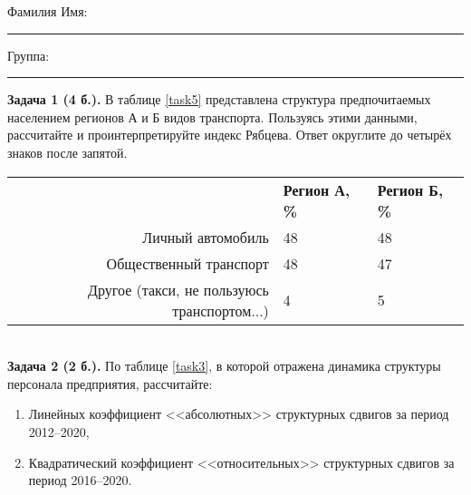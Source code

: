 \documentclass{article}
\begin{document}
\mbox{}

\vspace{-36pt}

\begin{center}
	\begin{tcolorbox}[colback=white, boxrule=0.20ex, sharp corners = all, height=25pt, colframe=black, valign=top]
		\begin{center}
			Фамилия Имя:\hspace{1.5pt}\rule{190pt}{0pt}\hspace{50pt}Группа:\hspace{1.5pt}\rule{60pt}{0pt}
		\end{center}
	\end{tcolorbox}
\end{center}
\vspace{3pt}

\textbf{Задача 1 (4 б.).} В таблице \ref{task5} представлена структура предпочитаемых населением регионов А и Б видов транспорта. Пользуясь этими данными, рассчитайте и проинтерпретируйте индекс Рябцева. Ответ округлите до четырёх знаков после запятой.\\

\begin{minipage}{\textwidth}
\centering
\begin{tabularx}{0.7\textwidth}{rYY}
\toprule
 & \textbf{Регион А, \%} & \textbf{Регион Б, \%} \\
\cmidrule(lr){2-2}\cmidrule(lr){3-3}
Личный автомобиль & 48 & 48 \\

Общественный транспорт & 48 & 47 \\

Другое (такси, не пользуюсь транспортом...) & 4 & 5 \\
\bottomrule
\end{tabularx}
\label{task5}
\end{minipage} \\[35pt]

\textbf{Задача 2 (2 б.).} По таблице \ref{task3}, в которой отражена динамика структуры персонала предприятия, рассчитайте:
\begin{enumerate}[leftmargin=40pt]
\item Линейных коэффициент <<абсолютных>> структурных сдвигов за период 2012--2020,
\item Квадратический коэффициент <<относительных>> структурных сдвигов за период 2016--2020.\medskip
\end{enumerate}
\end{document}

